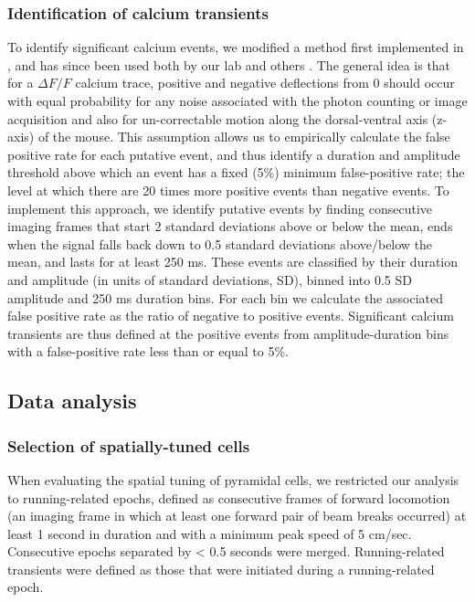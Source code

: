 \subsubsection{Identification of calcium transients}
To identify significant calcium events, we modified a method first implemented in \citealt{Dombeck2007}, and has since been used both by our lab \citep{Danielson2016a}\citep{Danielson2016b}\citep{Lovett-Barron2014} and others \citep{Dombeck2010}\citep{Rajasethupathy2015}. The general idea is that for a $\Delta F/F$ calcium trace, positive and negative deflections from 0 should occur with equal probability for any noise associated with the photon counting or image acquisition and also for un-correctable motion along the dorsal-ventral axis (z-axis) of the mouse. This assumption allows us to empirically calculate the false positive rate for each putative event, and thus identify a duration and amplitude threshold above which an event has a fixed (5$\%$) minimum false-positive rate; the level at which there are 20 times more positive events than negative events. To implement this approach, we identify putative events by finding consecutive imaging frames that start 2 standard deviations above or below the mean, ends when the signal falls back down to 0.5 standard deviations above/below the mean, and lasts for at least 250 ms. These events are classified by their duration and amplitude (in units of standard deviations, SD), binned into 0.5 SD amplitude and 250 ms duration bins. For each bin we calculate the associated false positive rate as the ratio of negative to positive events. Significant calcium transients are thus defined at the positive events from amplitude-duration bins with a false-positive rate less than or equal to 5$\%$.

\subsection{Data analysis}
\subsubsection{Selection of spatially-tuned cells}
When evaluating the spatial tuning of pyramidal cells, we restricted our analysis to running-related epochs, defined as consecutive frames of forward locomotion (an imaging frame in which at least one forward pair of beam breaks occurred) at least 1 second in duration and with a minimum peak speed of 5 cm/sec.  Consecutive epochs separated by < 0.5 seconds were merged.  Running-related transients were defined as those that were initiated during a running-related epoch.

